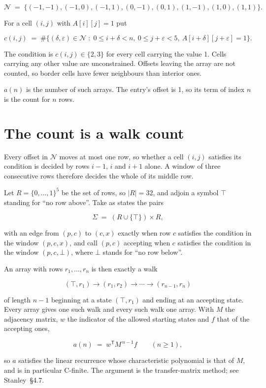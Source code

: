 \documentclass[11pt]{article}
\theoremstyle{definition}
\begin{document}
\[\mathcal{N} \;=\; \{(-1,-1), (-1,0), (-1,1), (0,-1), (0,1), (1,-1), (1,0), (1,1)\}.\]

For a cell $(i,j)$ with $A[i][j] = 1$ put

\[c(i,j) \;=\; \#\bigl\{(\delta,\varepsilon)\in\mathcal{N} \;:\; 0\le i+\delta<n,\ 0\le j+\varepsilon<5,\ A[i+\delta][j+\varepsilon] = 1\bigr\}.\]

The condition is $c(i,j) \in \{2, 3\}$ for every cell carrying the value 1. Cells carrying any other value are unconstrained. Offsets leaving the array are not counted, so border cells have fewer neighbours than interior ones.

$a(n)$ is the number of such arrays. The entry's offset is 1, so its term of index $n$ is the count for $n$ rows.

\section{The count is a walk count}

Every offset in $\mathcal{N}$ moves at most one row, so whether a cell $(i,j)$ satisfies its condition is decided by rows $i-1$, $i$ and $i+1$ alone. A window of three consecutive rows therefore decides the whole of its middle row.

Let $R = \{0,\dots,1\}^{5}$ be the set of rows, so $|R| = 32$, and adjoin a symbol $\top$ standing for ``no row above''. Take as states the pairs

\[\Sigma \;=\; (R \cup \{\top\}) \times R,\]

with an edge from $(p,c)$ to $(c,x)$ exactly when row $c$ satisfies the condition in the window $(p,c,x)$, and call $(p,c)$ accepting when $c$ satisfies the condition in the window $(p,c,\bot)$, where $\bot$ stands for ``no row below''.

An array with rows $r_1,\dots,r_n$ is then exactly a walk

\[(\top,r_1) \to (r_1,r_2) \to \cdots \to (r_{n-1},r_n)\]

of length $n-1$ beginning at a state $(\top,r_1)$ and ending at an accepting state. Every array gives one such walk and every such walk one array. With $M$ the adjacency matrix, $w$ the indicator of the allowed starting states and $f$ that of the accepting ones,

\[a(n) \;=\; w^{\mathsf T} M^{\,n-1} f \qquad (n \ge 1),\]

so $a$ satisfies the linear recurrence whose characteristic polynomial is that of $M$, and is in particular C-finite. The argument is the transfer-matrix method; see Stanley~\S4.7.
\end{document}
